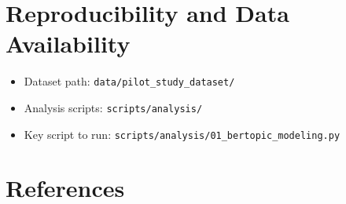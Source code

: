 \documentclass[11pt,a4paper]{article}
\begin{document}
\section{Reproducibility and Data Availability}
\begin{itemize}
  \item Dataset path: \texttt{data/pilot\_study\_dataset/}
  \item Analysis scripts: \texttt{scripts/analysis/}
  \item Key script to run: \texttt{scripts/analysis/01\_bertopic\_modeling.py}
\end{itemize}

\section{References}
\end{document}
